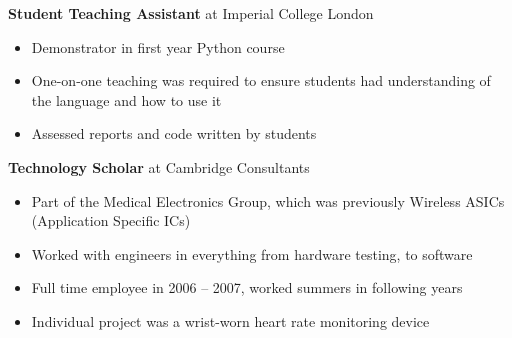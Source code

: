 \vspace{-1em}

{
  \textbf{Student Teaching Assistant} at Imperial College London
  \begin{itemize}
    \item Demonstrator in first year Python course
    \item One-on-one teaching was required to ensure students had understanding
      of the language and how to use it
    \item Assessed reports and code written by students
  \end{itemize}
}

\vspace{-1em}

{
  \textbf{Technology Scholar} at Cambridge Consultants
  \begin{itemize}
    \item Part of the Medical Electronics Group, which was previously Wireless ASICs (Application
      Specific ICs)
    \item Worked with engineers in everything from hardware testing, to software
    \item Full time employee in 2006 -- 2007, worked summers in following years
    \item Individual project was a wrist-worn heart rate monitoring device
  \end{itemize}
}

\vspace{-1em}

